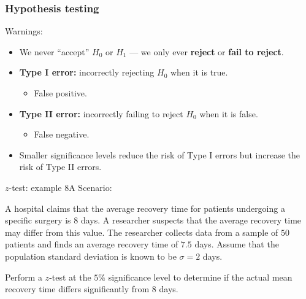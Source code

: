 \documentclass[t,8pt]{beamer}
\begin{document}
\begin{frame}
	\frametitle{Hypothesis testing}
	Warnings:
	\begin{itemize}
		\item We never ``accept'' $H_0$ or $H_1$ — we only ever {\bf reject} or {\bf fail to reject}.
		\item {\bf Type I error:} incorrectly rejecting $H_0$ when it is true.
		\begin{itemize}
			\item False positive.
		\end{itemize}
		\item {\bf Type II error:} incorrectly failing to reject $H_0$ when it is false.
		\begin{itemize}
			\item False negative.
		\end{itemize}
		\item Smaller significance levels reduce the risk of Type I errors but increase the risk of Type II errors.
	\end{itemize}
\end{frame}

\begin{frame}{$z$-test: example 8A}
	Scenario: \par
	A hospital claims that the average recovery time for patients undergoing a specific surgery is $8$ days. A researcher suspects that the average recovery time may differ from this value. The researcher collects data from a sample of $50$ patients and finds an average recovery time of $7.5$ days. Assume that the population standard deviation is known to be $\sigma = 2$ days. \par
	
	Perform a $z$-test at the $5\%$ significance level to determine if the actual mean recovery time differs significantly from $8$ days.
\end{frame}
\end{document}
